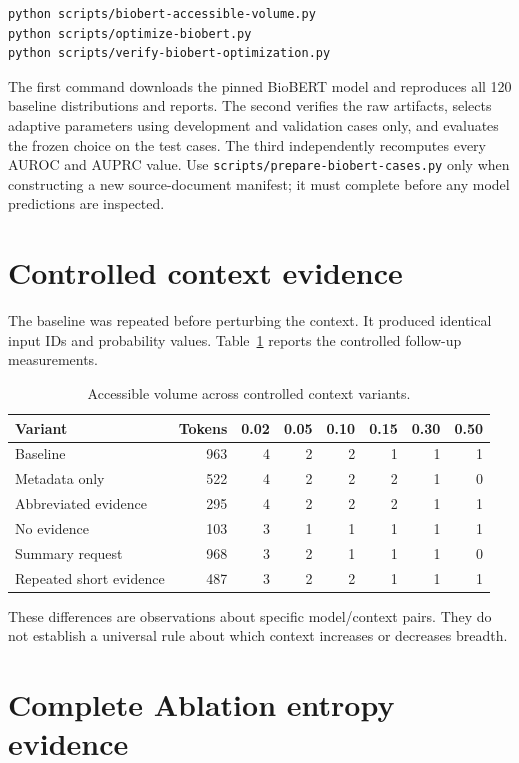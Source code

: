\documentclass[11pt,a4paper]{article}
\begin{document}
\begin{lstlisting}
python scripts/biobert-accessible-volume.py
python scripts/optimize-biobert.py
python scripts/verify-biobert-optimization.py
\end{lstlisting}

The first command downloads the pinned BioBERT model and reproduces all 120 baseline distributions and reports. The second verifies the raw artifacts, selects adaptive parameters using development and validation cases only, and evaluates the frozen choice on the test cases. The third independently recomputes every AUROC and AUPRC value. Use \texttt{scripts/prepare-biobert-cases.py} only when constructing a new source-document manifest; it must complete before any model predictions are inspected.

\section{Controlled context evidence}
The baseline was repeated before perturbing the context. It produced identical input IDs and probability values. Table~\ref{tab:context-proof} reports the controlled follow-up measurements.

{\scriptsize
\begin{table}[h]
\centering
\caption{Accessible volume across controlled context variants.}
\label{tab:context-proof}
\setlength{\tabcolsep}{4pt}
\begin{tabular}{lrrrrrrr}
\toprule
Variant & Tokens & 0.02 & 0.05 & 0.10 & 0.15 & 0.30 & 0.50 \\
\midrule
Baseline & 963 & 4 & 2 & 2 & 1 & 1 & 1 \\
Metadata only & 522 & 4 & 2 & 2 & 2 & 1 & 0 \\
Abbreviated evidence & 295 & 4 & 2 & 2 & 2 & 1 & 1 \\
No evidence & 103 & 3 & 1 & 1 & 1 & 1 & 1 \\
Summary request & 968 & 3 & 2 & 1 & 1 & 1 & 0 \\
Repeated short evidence & 487 & 3 & 2 & 2 & 1 & 1 & 1 \\
\bottomrule
\end{tabular}
\end{table}
}

These differences are observations about specific model/context pairs. They do not establish a universal rule about which context increases or decreases breadth.

\section{Complete Ablation entropy evidence}

\end{document}
